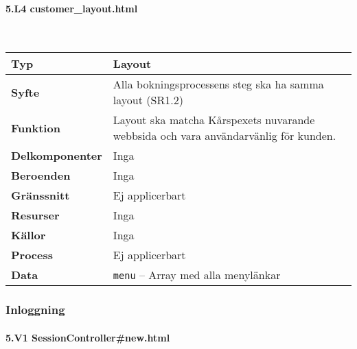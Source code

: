 \documentclass[a4paper, twoside, 11pt, titlepage]{article}
\begin{document}
			\paragraph{5.L4 customer\_layout.html}\

			\begin {table} [ht] \begin{tabular} {  p{3.5cm} p{11.6cm} }
				\hline
				{\sffamily\textbf{Typ}} & {Layout} \\
				\hline
				{\sffamily\textbf{Syfte}} & {Alla bokningsprocessens steg ska ha samma layout (SR1.2)} \\
				\hline
				{\sffamily\textbf{Funktion}} & {Layout ska matcha Kårspexets nuvarande webbsida och vara användarvänlig för kunden.} \\
				\hline
				{\sffamily\textbf{Delkomponenter}} & {Inga} \\
				\hline
				{\sffamily\textbf{Beroenden}} & {Inga} \\
				\hline
				{\sffamily\textbf{Gränssnitt}} & {Ej applicerbart} \\
				\hline
				{\sffamily\textbf{Resurser}} & {Inga} \\
				\hline
				{\sffamily\textbf{Källor}} & {Inga} \\
				\hline
				{\sffamily\textbf{Process}} & {Ej applicerbart} \\
				\hline
				{\sffamily\textbf{Data}} & {{\tt menu} – Array med alla menylänkar} \\
				\hline
			\end{tabular} \end{table} \FloatBarrier


		\subsubsection{Inloggning}



			\paragraph{5.V1 SessionController\#new.html}\
\end{document}
